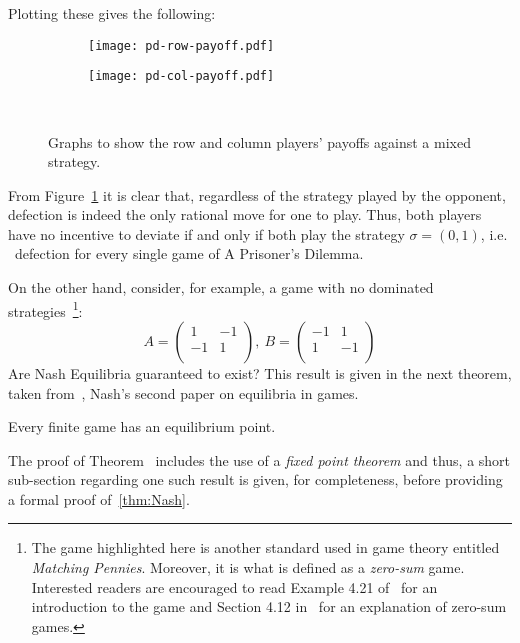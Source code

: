 Plotting these gives the following:
\begin{figure}[h]
    \centering
        \begin{subfigure}[t]{0.45\textwidth}
        \centering
            \texttt{[image: pd-row-payoff.pdf]}
        \end{subfigure}
    \hfill
        \begin{subfigure}[t]{0.45\textwidth}
        \centering
            \texttt{[image: pd-col-payoff.pdf]}
        \end{subfigure}~\caption{Graphs to show the row and column players' payoffs against a 
        mixed strategy.}\label{fig:mixed_strategy_PD}
    \end{figure}
From Figure~\ref{fig:mixed_strategy_PD} it is clear that, regardless of the
strategy played by the opponent, defection is indeed the only rational move for
one to play. Thus, both players have no incentive to deviate if and only if both
play the strategy \(\sigma=(0, 1)\), i.e. \ defection for every single game of A
Prisoner's Dilemma.

On the other hand, consider, for example, a game with no dominated
strategies~\footnote{The game highlighted here is another standard used in game
theory entitled \emph{Matching Pennies}. Moreover, it is what is defined as a
\emph{zero-sum} game. Interested readers are encouraged to read Example 4.21
of~\cite{Webb2007} for an introduction to the game and Section 4.12
in~\cite{maschler_solan_zamir_2013} for an explanation of zero-sum games.}:
\[
    A =
    \begin{pmatrix}
        1 & -1\\
        -1 & 1\\
    \end{pmatrix}, \ B =
    \begin{pmatrix}
        -1 & 1\\
        1 & -1\\
    \end{pmatrix}
\]
Are Nash Equilibria guaranteed to exist? This result is given in the next
theorem, taken from~\cite{nash1951non}, Nash's second paper on equilibria in 
games.

\begin{theorem}\label{thm:Nash}
    Every finite game has an equilibrium point.
\end{theorem}

The proof of Theorem~\label{thm:Nash} includes the use of a \emph{fixed point
theorem} and thus, a short sub-section regarding one such result is given, for
completeness, before providing a formal proof of~\ref{thm:Nash}.

